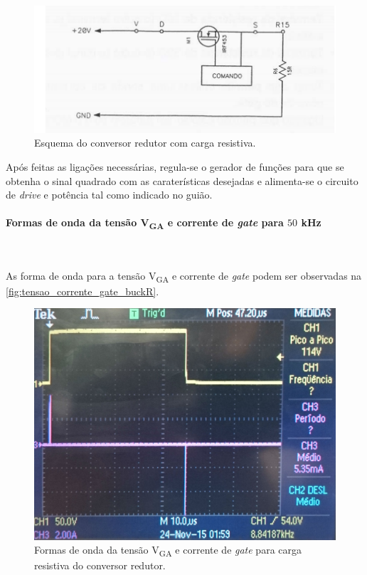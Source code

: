 \documentclass[a4paper,11pt]{article}
\numberwithin{equation}{section}
\begin{document}
\begin{figure}[h]
	\centering
	\includegraphics[keepaspectratio=true, scale=0.8]{teoricas/Redutor_R}
	\caption{Esquema do conversor redutor com carga resistiva.}
	\label{fig:Red_R}
	\vspace{-0.8em}
\end{figure}

	Após feitas as ligações necessárias, regula-se o gerador de funções para que se obtenha o sinal quadrado com as caraterísticas desejadas e alimenta-se o circuito de \textit{drive} e potência tal como indicado no guião.
	
\paragraph{Formas de onda da tensão V\textsubscript{GA} e corrente de \textit{gate} para $50$ kHz}\mbox{}\

As forma de onda para a tensão V\textsubscript{GA} e corrente de \textit{gate} podem ser observadas na \autoref{fig:tensao_corrente_gate_buckR}.

\begin{figure}[h]
	\centering
	\includegraphics[keepaspectratio=true, scale=0.13]{img/figs/tensao_corrente_gate_buckR}
	\caption{Formas de onda da tensão V\textsubscript{GA} e corrente de \textit{gate} para carga resistiva do conversor redutor.}
	\label{fig:tensao_corrente_gate_buckR}
	\vspace{-0.8em}
\end{figure} 
\end{document}
